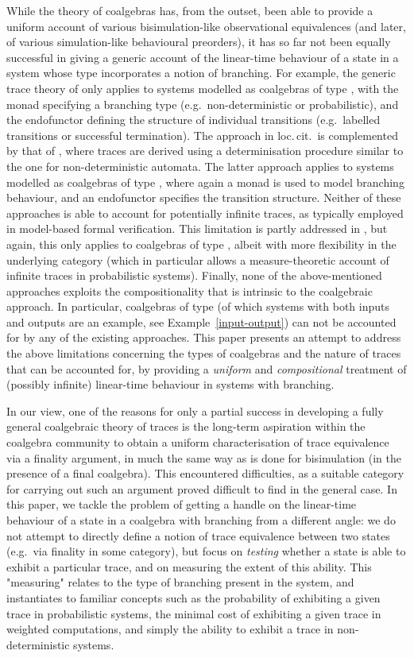 \documentclass[submission,copyright,creativecommons]{eptcs}
\theoremstyle{plain}\newtheorem{theorem}{Theorem}[section]
\theoremstyle{remark}
\begin{document}
While the theory of coalgebras has, from the outset, been able to provide a uniform account of various bisimulation-like observational equivalences (and later, of various simulation-like behavioural preorders), it has so far not been equally successful in giving a generic account of the linear-time behaviour of a state in a system whose type incorporates a notion of branching. For example, the generic trace theory of \cite{HasuoJS07} only applies to systems modelled as coalgebras of type , with the monad  specifying a branching type (e.g.~non-deterministic or probabilistic), and the endofunctor  defining the structure of individual transitions (e.g.~labelled transitions or successful termination). The approach in loc.\,cit.~is complemented by that of \cite{JacobsSS12}, where traces are derived using a determinisation procedure similar to the one for non-deterministic automata. The latter approach applies to systems modelled as coalgebras of type , where again a monad  is used to model branching behaviour, and an endofunctor  specifies the transition structure. Neither of these approaches is able to account for potentially infinite traces, as typically employed in model-based formal verification. This limitation is partly addressed in \cite{cirstea-11}, but again, this only applies to coalgebras of type , albeit with more flexibility in the underlying category (which in particular allows a measure-theoretic account of infinite traces in probabilistic systems). Finally, none of the above-mentioned approaches exploits the compositionality that is intrinsic to the coalgebraic approach. In particular, coalgebras of type  (of which systems with both inputs and outputs are an example, see Example~\ref{input-output}) can not be accounted for by any of the existing approaches. This paper presents an attempt to address the above limitations concerning the types of coalgebras and the nature of traces that can be accounted for, by providing a \emph{uniform} and \emph{compositional} treatment of (possibly infinite) linear-time behaviour in systems with branching.

In our view, one of the reasons for only a partial success in developing a fully general coalgebraic theory of traces is the long-term aspiration within the coalgebra community to obtain a uniform characterisation of trace equivalence via a finality argument, in much the same way as is done for bisimulation (in the presence of a final coalgebra). This encountered difficulties, as a suitable category for carrying out such an argument proved difficult to find in the general case. In this paper, we tackle the problem of getting a handle on the linear-time behaviour of a state in a coalgebra with branching from a different angle: we do not attempt to directly define a notion of trace equivalence between two states (e.g.~via finality in some category), but focus on \emph{testing} whether a state is able to exhibit a particular trace, and on  measuring the extent of this ability. This "measuring" relates to the type of branching present in the system, and instantiates to familiar concepts such as the probability of exhibiting a given trace in probabilistic systems, the minimal cost of exhibiting a given trace in weighted computations, and simply the ability to exhibit a trace in non-deterministic systems.
\end{document}
